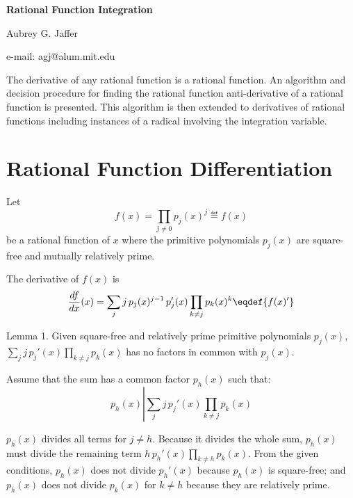 


\centerline{\bf{Rational Function Integration}}
\centerline{Aubrey G. Jaffer}
\centerline{e-mail: agj@alum.mit.edu}


{\narrower

  The derivative of any rational function is a rational function.  An
  algorithm and decision procedure for finding the rational function
  anti-derivative of a rational function is presented.  This algorithm
  is then extended to derivatives of rational functions including
  instances of a radical involving the integration variable.

  \par}



\def\lc{{\rm lc}\,}
\def\coeff{{\rm coeff}\,}

\section{Rational Function Differentiation}

Let
$$f(x)=\prod_{j\ne0} p_j(x)^j\eqdef{f(x)}$$ be a rational
function of $x$ where the primitive polynomials $p_j(x)$ are
square-free and mutually relatively prime.

The derivative of $f(x)$ is
$${d{f}\over d{x}}(x)=\sum_{j} j\,p_j(x)^{j-1}\,{p_j'}(x)\prod_{k\neq j}p_k(x)^k
  \eqdef{f(x)'}$$

\proclaim Lemma 1. {
Given square-free and relatively prime primitive polynomials $p_j(x)$,
$\sum_jj\,{p_j'}(x)\prod_{k\neq j}p_k(x)$ has no factors in common
with $p_j(x)$.}\par

Assume that the sum has a common factor $p_h(x)$ such that:
$$p_h(x)\left|\sum_jj\,{p_j'}(x)\prod_{k\neq j}p_k(x)\right.$$

$p_h(x)$ divides all terms for $j\neq h$.  Because it divides the
whole sum, $p_h(x)$ must divide the remaining term $h\,p_h'(x)
\prod_{k\neq h} p_k(x)$.  From the given conditions, $p_h(x)$
does not divide $p_h'(x)$ because $p_h(x)$ is square-free; and $p_h(x)$
does not divide $p_k(x)$ for $k\neq h$ because they are relatively
prime.

